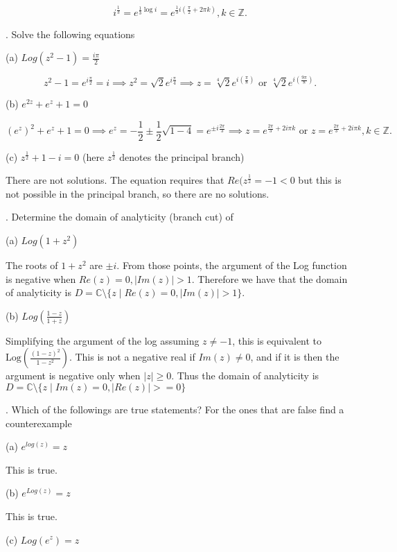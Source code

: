 \documentclass[letterpaper, reqno,11pt]{article}
\begin{document}
\[
i^{\frac{1}{3}}=e^{\frac{1}{3}\log i}=e^{\frac{1}{3}i\left( \frac{\pi}{2}+2\pi k \right) }, k\in\mathbb{Z}
.\]

\medskip

. Solve the following equations

(a) $ Log (z^2-1)= \frac{i\pi}{2}$

\[
z^2-1=e^{i\frac{\pi}{2}}=i\implies z^2=\sqrt{2} e^{i\frac{\pi}{4}}\implies z=\sqrt[4]{2}e^{i\left( \frac{\pi}{8}\right) } \text{ or }\sqrt[4]{2}e^{i\left( \frac{9\pi}{8}\right) }
.\]

(b) $ e^{2z}+ e^z+1=0$

\[
(e^z)^2+e^z+1=0\implies e^z=-\frac{1}{2}\pm \frac{1}{2}\sqrt{1-4}=e^{\pm i\frac{2\pi}{3}}\implies z=e^{\frac{2\pi}{3}+2i \pi k}\text{ or }z=e^{\frac{2\pi}{3}+2i \pi k}, k\in\mathbb{Z}
.\]

(c) $ z^{\frac{1}{2}} +1-i=0$ (here $z^{\frac{1}{2}}$ denotes the principal branch)

There are not solutions. The equation requires that $Re(z^{\frac{1}{2}}=-1<0$ but this is not possible in the principal branch, so there are no solutions. 


\medskip

. Determine the domain of analyticity (branch cut) of

(a) $ Log (1+z^2)$

The roots of $1+z^2$ are $\pm i$. From those points, the argument of the Log function is negative when $Re(z)=0, |Im(z)|>1$. Therefore we have that the domain of analyticity is  $D=\mathbb{C}\setminus\{z\mid Re(z)=0, |Im(z)| >1\} $. 

(b) $ Log (\frac{1-z}{1+z})$

Simplifying the argument of the log assuming $z\neq -1$, this is equivalent to $\text{Log}\left( \frac{(1-z)^2}{1-z^2} \right) $. This is not a negative real if $Im(z)\neq 0$, and if it is then the argument is negative only when $|z|\geq 0$. Thus the domain of analyticity is $D=\mathbb{C}\setminus\{z\mid Im(z)=0, |Re(z)| >=0\} $


\medskip

. Which of the followings are true statements? For the ones that are false find a counterexample

(a) $ e^{ log (z)} = z $

This is true. 

(b) $ e^{ Log (z)}=z$

This is true. 

(c) $ Log (e^z)=z$
\end{document}
